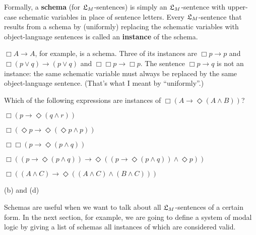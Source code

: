 
Formally, a \textbf{schema} (for $\mathfrak{L}_{M}$-sentences) is simply an
$\mathfrak{L}_{M}$-sentence with upper-case schematic variables in place of sentence
letters. Every $\mathfrak{L}_{M}$-sentence that results from a schema by (uniformly)
replacing the schematic variables with object-language sentences is called an
\textbf{instance} of the schema.


$\Box A \to A$, for example, is a schema. Three of its instances are
$\Box p \to p$ and $\Box (p \lor q) \to (p \lor q)$ and
$\Box \Box p \to \Box p$. The sentence $\Box p \to q$ is not an instance: the
same schematic variable must always be replaced by the same object-language
sentence. (That's what I meant by ``uniformly''.)

\begin{exercise}
  Which of the following expressions are instances of
  $\Box(A\to \Diamond (A \land B))$?
  \begin{exlist}
  \item $\Box(p \to \Diamond (q\land r))$
  \item $\Box(\Diamond p \to \Diamond (\Diamond p\land p))$
  \item $\Box\Box(p \to \Diamond (p \land q))$
  \item $\Box((p \to \Diamond (p \land q)) \to \Diamond((p \to \Diamond (p \land q)) \land \Diamond p))$
  \item $\Box((A\land C) \to \Diamond ((A\land C) \land (B\land C)))$
  \end{exlist}
\end{exercise}
\begin{solution}
  (b) and (d)
\end{solution}


Schemas are useful when we want to talk about all $\mathfrak{L}_{M}$-sentences of a
certain form. In the next section, for example, we are going to define a system
of modal logic by giving a list of schemas all instances of which are considered
valid.

